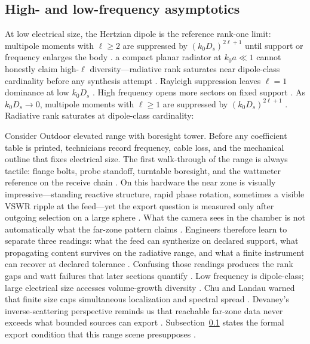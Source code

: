 \subsection{High- and low-frequency asymptotics}
\label{sec:ch482}
At low electrical size, the Hertzian dipole is the reference rank-one limit: multipole moments with $\ell\ge 2$ are suppressed by $(k_0 D_s)^{2\ell+1}$ until support or frequency enlarges the body \cite{jackson1999}. a compact planar radiator at $k_0 a\ll 1$ cannot honestly claim high-$\ell$ diversity---radiative rank saturates near dipole-class cardinality before any synthesis attempt \cite{harrington2001}.
Rayleigh suppression leaves $\ell=1$ dominance at low $k_0 D_s$ \cite{jackson1999}. High frequency opens more sectors on fixed support \cite{hansen1988}.
\medskip
As \(k_{0}D_{s}\to0\), multipole moments with \(\ell\ge1\) are suppressed by \((k_{0}D_{s})^{2\ell+1}\) \cite{jackson1999}. Radiative rank
saturates at dipole-class cardinality:
\begin{physicalvignette}
Consider Outdoor elevated range with boresight tower. Before any coefficient table is printed, technicians record frequency, cable loss, and the mechanical outline that fixes electrical size. The first walk-through of the range is always tactile: flange bolts, probe standoff, turntable boresight, and the wattmeter reference on the receive chain \cite{hansen1988}.
On this hardware the near zone is visually impressive---standing reactive structure, rapid phase rotation, sometimes a visible VSWR ripple at the feed---yet the export question is measured only after outgoing selection on a large sphere \cite{harrington2001}. What the camera sees in the chamber is not automatically what the far-zone pattern claims \cite{stratton1941}.
Engineers therefore learn to separate three readings: what the feed can synthesize on declared support, what propagating content survives on the radiative range, and what a finite instrument can recover at declared tolerance \cite{devaney2004}. Confusing those readings produces the rank gaps and watt failures that later sections quantify \cite{pal2026}.
Low frequency is dipole-class; large electrical size accesses volume-growth diversity . 
Chu and Landau warned that finite size caps simultaneous localization and spectral spread \cite{chu1948}. Devaney's inverse-scattering perspective reminds us that reachable far-zone data never exceeds what bounded sources can export \cite{devaney2004}.
Subsection~\ref{sec:ch482} states the formal export condition that this range scene presupposes \cite{stratton1941}.
\end{physicalvignette}
